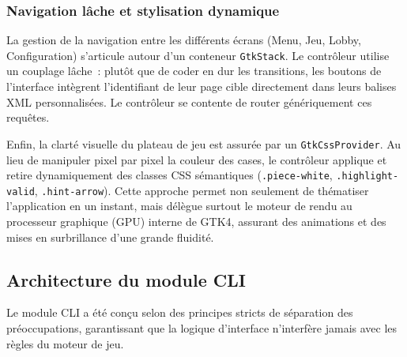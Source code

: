 \documentclass[a4paper]{article}
\begin{document}
\subsubsection{Navigation lâche et stylisation dynamique}

La gestion de la navigation entre les différents écrans (Menu, Jeu, Lobby, Configuration) s'articule autour d'un conteneur \texttt{GtkStack}. Le contrôleur utilise un couplage lâche~: plutôt que de coder en dur les transitions, les boutons de l'interface intègrent l'identifiant de leur page cible directement dans leurs balises XML personnalisées. Le contrôleur se contente de router génériquement ces requêtes.

Enfin, la clarté visuelle du plateau de jeu est assurée par un \texttt{GtkCssProvider}. Au lieu de manipuler pixel par pixel la couleur des cases, le contrôleur applique et retire dynamiquement des classes CSS sémantiques (\texttt{.piece-white}, \texttt{.highlight-valid}, \texttt{.hint-arrow}). Cette approche permet non seulement de thématiser l'application en un instant, mais délègue surtout le moteur de rendu au processeur graphique (GPU) interne de GTK4, assurant des animations et des mises en surbrillance d'une grande fluidité.




\subsection{Architecture du module CLI}
\label{sec:cli-arch}

Le module CLI a été conçu selon des principes stricts de séparation des préoccupations, garantissant que la logique d'interface n'interfère jamais avec les règles du moteur de jeu. 
\end{document}
